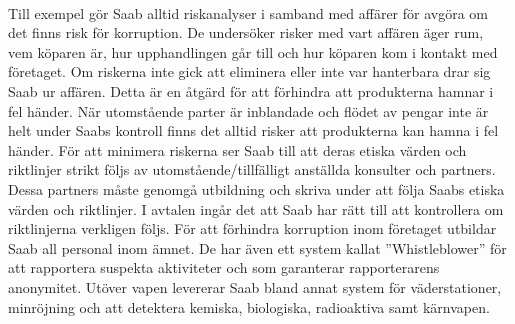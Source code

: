 \\
Till exempel gör Saab alltid riskanalyser i samband med affärer för avgöra om det finns risk för korruption. De undersöker risker med vart affären äger rum, vem köparen är, hur upphandlingen går till och hur köparen kom i kontakt med företaget. Om riskerna inte gick att eliminera eller inte var hanterbara drar sig Saab ur affären. Detta är en åtgärd för att förhindra att produkterna hamnar i fel händer. 
\newline
\newline
När utomstående parter är inblandade och flödet av pengar inte är helt under Saabs kontroll finns det alltid risker att produkterna kan hamna i fel händer. För att minimera riskerna ser Saab till att deras etiska värden och riktlinjer strikt följs av utomstående/tillfälligt anställda konsulter och partners. Dessa partners måste genomgå utbildning och skriva under att följa Saabs etiska värden och riktlinjer. I avtalen ingår det att Saab har rätt till att kontrollera om riktlinjerna verkligen följs.   
\newline
\newline
För att förhindra korruption inom företaget utbildar Saab all personal inom ämnet. De har även ett system kallat ''Whistleblower'' för att rapportera suspekta aktiviteter och som garanterar rapporterarens anonymitet.              
\newline
\newline
Utöver vapen levererar Saab bland annat system för väderstationer, minröjning och att detektera kemiska, biologiska, radioaktiva samt kärnvapen. \citep{security}

